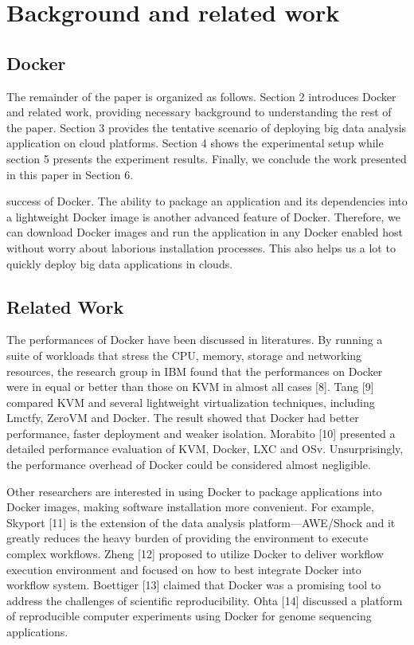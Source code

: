\documentclass{ieicej}
\begin{document}
\section{Background and related work}
\subsection{Docker}
The remainder of the paper is organized as follows. Section 2 introduces Docker and related work, providing necessary background to understanding the rest of the paper. Section 3 provides the tentative scenario of deploying big data analysis application on cloud platforms. Section 4 shows the experimental setup while section 5 presents the experiment results. Finally, we conclude the work presented in this paper in Section 6.

success of Docker. The ability to package an application and its dependencies into a lightweight Docker image is another advanced feature of Docker. Therefore, we can download Docker images and run the application in any Docker enabled host without worry about laborious installation processes. This also helps us a lot to quickly deploy big data applications in clouds.


\subsection{Related Work}
The performances of Docker have been discussed in literatures. By running a suite of workloads that stress the CPU, memory, storage and networking resources, the research group in IBM found that the performances on Docker were in equal or better than those on KVM in almost all cases [8].  Tang [9] compared KVM and several lightweight virtualization techniques, including Lmctfy, ZeroVM and Docker. The result showed that Docker had better performance, faster deployment and weaker isolation. Morabito [10] presented a detailed performance evaluation of KVM, Docker, LXC and OSv. Unsurprisingly, the performance overhead of Docker could be considered almost negligible.


Other researchers are interested in using Docker to package applications into Docker images, making software installation more convenient. For example, Skyport [11] is the extension of the data analysis platform---AWE/Shock and it greatly reduces the heavy burden of providing the environment to execute complex workflows. Zheng [12] proposed to utilize Docker to deliver workflow execution environment and focused on how to best integrate Docker into workflow system. Boettiger [13] claimed that Docker was a promising tool to address the challenges of scientific reproducibility. Ohta [14] discussed a platform of reproducible computer experiments using Docker for genome sequencing applications.
\end{document}
